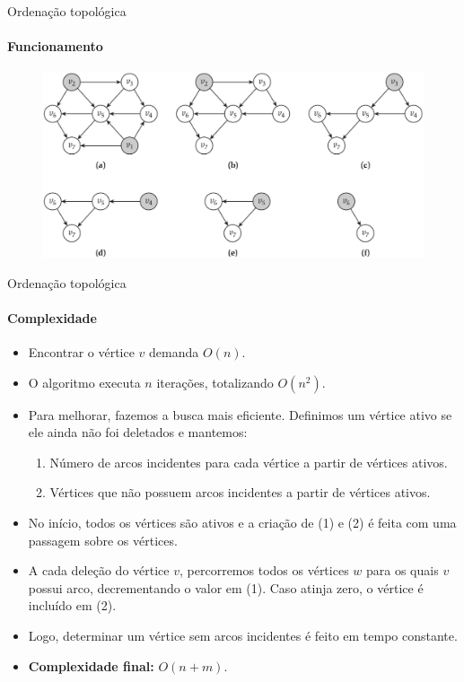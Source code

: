 \begin{frame}{Ordenação topológica}
	\framesubtitle{Funcionamento}

	\begin{figure}
		\centering
		\includegraphics[width=1\linewidth]{img/execucao-ordenacao-topologica}
	\end{figure}

\end{frame}



\begin{frame}{Ordenação topológica}
	\framesubtitle{Complexidade}
	
	\begin{itemize}
		\item Encontrar o vértice $v$ demanda $O(n)$.
		\item O algoritmo executa $n$ iterações, totalizando $O(n^2)$.
		\item Para melhorar, fazemos a busca mais eficiente. Definimos um vértice ativo se ele ainda não foi deletados e mantemos:
		
		\begin{enumerate}
			\item Número de arcos incidentes para cada vértice a partir de vértices ativos.
			\item Vértices que não possuem arcos incidentes a partir de vértices ativos.
		\end{enumerate}
		
		\item No início, todos os vértices são ativos e a criação de (1) e (2) é feita com uma passagem sobre os vértices.
		
		\item A cada deleção do vértice $v$, percorremos todos os vértices $w$ para os quais $v$ possui arco, decrementando o valor em (1). Caso atinja zero, o vértice é incluído em (2).
		
		\item Logo, determinar um vértice sem arcos incidentes é feito em tempo constante.
		
		\item \textbf{Complexidade final:} $O(n + m)$.
	\end{itemize}
\end{frame}



